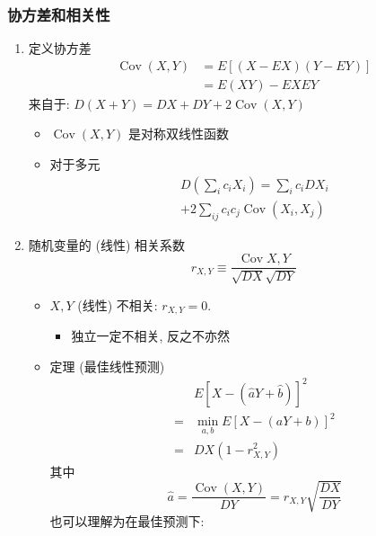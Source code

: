 \documentclass[11pt,a4paper,twocolumn]{article} %
\numberwithin{equation}{section} %
\DeclareMathOperator\cov{Cov}
\begin{document}
\subsubsection{协方差和相关性} %
\label{ssub:covariance}
\begin{enumerate}
	\item 定义协方差
	\begin{equation}
	\begin{split}
		\cov(X,Y) &= E[(X - EX)(Y - EY)]\\
		&= E(XY) - EXEY
	\end{split}
	\end{equation}
	来自于: $D(X+Y) = DX + DY + 2\cov(X,Y)$
	\begin{itemize}
		\item $\cov(X,Y)$ 是对称双线性函数
		\item 对于多元
		\begin{equation}
		\begin{split}
			D\left(\sum_i c_i X_i\right) = \sum_i c_i DX_i \\
			+ 2\sum_{ij} c_i c_j \cov(X_i, X_j)
		\end{split}
		\end{equation}
	\end{itemize}
	\item 随机变量的 (线性) 相关系数
	\begin{equation}
		r_{X,Y} \equiv \frac{\cov{X,Y}}{\sqrt{DX}\sqrt{DY}}
	\end{equation}
	\begin{itemize}
		\item $X, Y$ (线性) 不相关: $r_{X,Y} = 0$. 
		\begin{itemize}
			\item 独立一定不相关, 反之不亦然
		\end{itemize}
		\item 定理 (最佳线性预测)
		\begin{equation}\label{equ:linear_approx}
		\begin{split}
			&E[X - (\hat a Y + \hat b)]^2 \\
			=& \min_{a,b} E[X-(a Y +b)]^2 \\
			=& DX(1-r^2_{X,Y})
		\end{split}
		\end{equation}
		其中
		\begin{equation}
			\hat a = \frac{\cov(X,Y)}{DY} = r_{X, Y}\sqrt{\frac{DX}{DY}}
		\end{equation}
		也可以理解为在最佳预测下: 
		\begin{equation}

\end{equation}
\end{itemize}
\end{enumerate}
\end{document}
